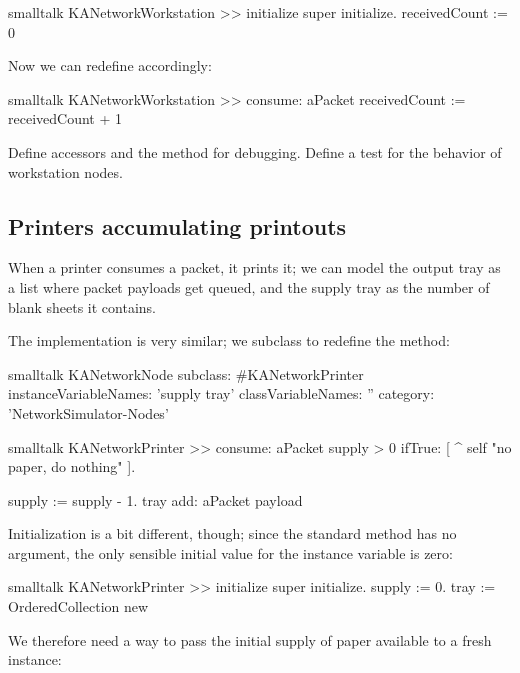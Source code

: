 \documentclass[10pt,twoside,english]{_support/latex/sbabook/sbabook}
\begin{document}
\begin{displaycode}{smalltalk}
KANetworkWorkstation >> initialize
    super initialize.
    receivedCount := 0
\end{displaycode}

Now we can redefine  accordingly:

\begin{displaycode}{smalltalk}
KANetworkWorkstation >> consume: aPacket
    receivedCount := receivedCount + 1
\end{displaycode}

Define accessors and the  method for debugging. 
Define a test for the behavior of workstation nodes.
\subsection{Printers accumulating printouts}
When a printer consumes a packet, it prints it; we can model the output tray as a list where packet payloads get queued, and the supply tray as the number of blank sheets it contains.

The implementation is very similar; we subclass  to redefine the  method:

\begin{displaycode}{smalltalk}
KANetworkNode subclass: #KANetworkPrinter
    instanceVariableNames: 'supply tray'
    classVariableNames: ''
    category: 'NetworkSimulator-Nodes'
\end{displaycode}

\begin{displaycode}{smalltalk}
KANetworkPrinter >> consume: aPacket
    supply > 0 ifTrue: [ ^ self "no paper, do nothing" ].

    supply := supply - 1.
    tray add: aPacket payload
\end{displaycode}

Initialization is a bit different, though; since the standard  method has no argument, the only sensible initial value for the  instance variable is zero:

\begin{displaycode}{smalltalk}
KANetworkPrinter >> initialize
    super initialize.
    supply := 0.
    tray := OrderedCollection new
\end{displaycode}

We therefore need a way to pass the initial supply of paper available to a fresh instance:
\end{document}
